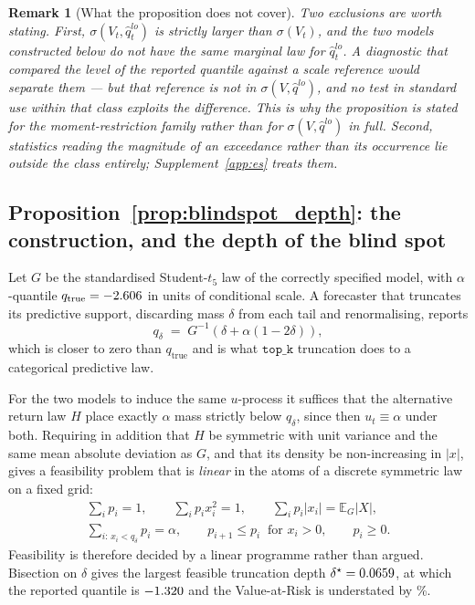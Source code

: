 \documentclass[preprint,11pt,authoryear]{elsarticle}
\newtheorem{remark}[theorem]{Remark}
\newcommand{\E}{\mathbb{E}}
\newcommand{\1}{\boldsymbol{1}}
\begin{document}
\begin{remark}[What the proposition does not cover]
	\label{rem:identification_scope}
	Two exclusions are worth stating. First, $\sigma(V_t, \hat q^{lo}_t)$ is
	strictly larger than $\sigma(V_t)$, and the two models constructed below do
	\emph{not} have the same marginal law for $\hat q^{lo}_t$. A diagnostic that
	compared the level of the reported quantile against a scale reference would
	separate them --- but that reference is not in $\sigma(V,\hat q^{lo})$, and no
	test in standard use within that class exploits the difference. This is why
	the proposition is stated for the moment-restriction family rather than for
	$\sigma(V,\hat q^{lo})$ in full. Second, statistics reading the
	\emph{magnitude} of an exceedance rather than its occurrence lie outside the
	class entirely; Supplement~\ref{app:es} treats them.
\end{remark}

\subsection{Proposition~\ref{prop:blindspot_depth}: the construction, and the depth of the blind spot}
\label{app:blindspot_depth}

Let $G$ be the standardised Student-$t_5$ law of the correctly specified model,
with $\alpha$-quantile $q_{\mathrm{true}} = -2.606$ in units of
conditional scale. A forecaster that truncates its predictive support, discarding
mass $\delta$ from each tail and renormalising, reports
\[
q_\delta \;=\; G^{-1}\!\left(\delta + \alpha(1-2\delta)\right),
\]
which is closer to zero than $q_{\mathrm{true}}$ and is what
$\texttt{top\_k}$ truncation does to a categorical predictive law.

For the two models to induce the same $u$-process it suffices that the
alternative return law $H$ place exactly $\alpha$ mass strictly below $q_\delta$,
since then $u_t \equiv \alpha$ under both. Requiring in addition that $H$ be
symmetric with unit variance and the same mean absolute deviation as $G$, and
that its density be non-increasing in $|x|$, gives a feasibility problem that is
\emph{linear} in the atoms of a discrete symmetric law on a fixed grid:
\begin{align*}
	\textstyle\sum_i p_i = 1, \qquad
	\textstyle\sum_i p_i x_i^2 = 1, \qquad
	\textstyle\sum_i p_i |x_i| = \E_G|X|, \\
	\textstyle\sum_{i:\,x_i < q_\delta} p_i = \alpha, \qquad
	p_{i+1} \le p_i \ \text{ for } x_i > 0, \qquad p_i \ge 0 .
\end{align*}
Feasibility is therefore decided by a linear programme rather than argued.
Bisection on $\delta$ gives the largest feasible truncation depth
$\delta^\star = 0.0659$, at which the reported quantile is
$-1.320$ and the Value-at-Risk is understated by \nGapUndUni\%.
\end{document}

